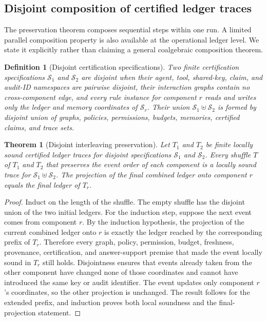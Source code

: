 \documentclass[a4paper,fleqn]{cas-sc}
\newtheorem{definition}{Definition}
\newtheorem{theorem}{Theorem}
\begin{document}
\subsection{Disjoint composition of certified ledger traces}

The preservation theorem composes sequential steps within one run. A limited
parallel composition property is also available at the operational ledger
level. We state it explicitly rather than claiming a general coalgebraic
composition theorem.

\begin{definition}[Disjoint certification specifications]\label{def:disjoint-specifications}
Two finite certification specifications \(\mathcal S_1\) and \(\mathcal S_2\)
are \emph{disjoint} when their agent, tool, shared-key, claim, and audit-ID
namespaces are pairwise disjoint, their interaction graphs contain no
cross-component edge, and every rule instance for component \(r\) reads and
writes only the ledger and memory coordinates of \(\mathcal S_r\). Their
union \(\mathcal S_1\uplus\mathcal S_2\) is formed by disjoint union of
graphs, policies, permissions, budgets, memories, certified claims, and trace
sets.
\end{definition}

\begin{theorem}[Disjoint interleaving preservation]\label{thm:disjoint-interleaving}
Let \(T_1\) and \(T_2\) be finite locally sound certified ledger traces for
disjoint specifications \(\mathcal S_1\) and \(\mathcal S_2\). Every
shuffle \(T\) of \(T_1\) and \(T_2\) that preserves the event order of
each component is a locally sound trace for
\(\mathcal S_1\uplus\mathcal S_2\). The projection of the final combined
ledger onto component \(r\) equals the final ledger of \(T_r\).
\end{theorem}

\begin{proof}
Induct on the length of the shuffle. The empty shuffle has the disjoint union
of the two initial ledgers. For the induction step, suppose the next event
comes from component \(r\). By the induction hypothesis, the projection of
the current combined ledger onto \(r\) is exactly the ledger reached by the
corresponding prefix of \(T_r\). Therefore every graph, policy, permission,
budget, freshness, provenance, certification, and answer-support premise that
made the event locally sound in \(T_r\) still holds. Disjointness ensures
that events already taken from the other component have changed none of those
coordinates and cannot have introduced the same key or audit identifier. The
event updates only component \(r\)'s coordinates, so the other projection is
unchanged. The result follows for the extended prefix, and induction proves
both local soundness and the final-projection statement.
\end{proof}
\end{document}
